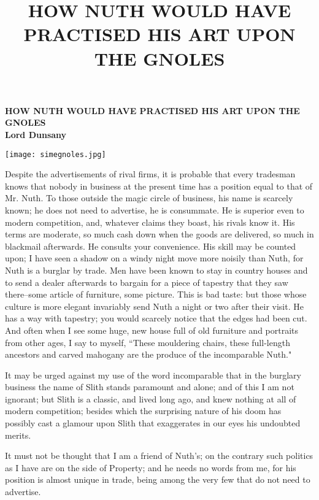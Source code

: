 \documentclass[12pt]{article}
\title{HOW NUTH WOULD HAVE PRACTISED HIS ART UPON THE GNOLES}
\begin{document}
\thispagestyle{empty}
\begin{center}
\textbf{\Large HOW NUTH WOULD HAVE PRACTISED HIS ART UPON THE GNOLES}\\
\textbf{Lord Dunsany}\\

\end{center}

\begin{center}
\texttt{[image: simegnoles.jpg]}
\end{center}


Despite the advertisements of rival firms, it is probable that every
tradesman knows that nobody in business at the present time has a
position equal to that of Mr. Nuth. To those outside the magic circle
of business, his name is scarcely known; he does not need to
advertise, he is consummate. He is superior even to modern
competition, and, whatever claims they boast, his rivals know it. His
terms are moderate, so much cash down when the goods are
delivered, so much in blackmail afterwards. He consults your
convenience. His skill may be counted upon; I have seen a shadow on a
windy night move more noisily than Nuth, for Nuth is a burglar by
trade. Men have been known to stay in country houses and to send a
dealer afterwards to bargain for a piece of tapestry that they saw
there--some article of furniture, some picture. This is bad taste: but
those whose culture is more elegant invariably send Nuth a night or
two after their visit. He has a way with tapestry; you would scarcely
notice that the edges had been cut. And often when I see some huge,
new house full of old furniture and portraits from other ages, I say
to myself, ``These mouldering chairs, these full-length ancestors and
carved mahogany are the produce of the incomparable Nuth."

It may be urged against my use of the word incomparable that in the
burglary business the name of Slith stands paramount and alone; and of
this I am not ignorant; but Slith is a classic, and lived long ago,
and knew nothing at all of modern competition; besides which the
surprising nature of his doom has possibly cast a glamour upon Slith
that exaggerates in our eyes his undoubted merits.

It must not be thought that I am a friend of Nuth's; on the contrary
such politics as I have are on the side of Property; and he needs no
words from me, for his position is almost unique in trade, being among
the very few that do not need to advertise.
\end{document}
